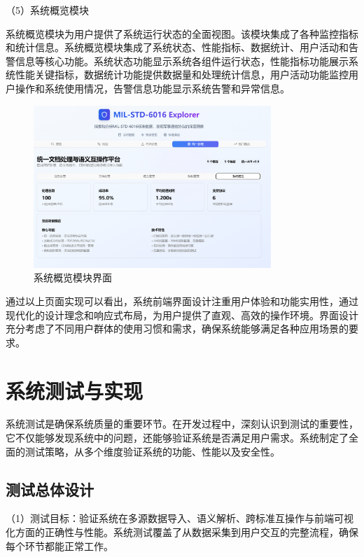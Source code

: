 （5）系统概览模块

系统概览模块为用户提供了系统运行状态的全面视图。该模块集成了各种监控指标和统计信息。系统概览模块集成了系统状态、性能指标、数据统计、用户活动和告警信息等核心功能。系统状态功能显示系统各组件运行状态，性能指标功能展示系统性能关键指标，数据统计功能提供数据量和处理统计信息，用户活动功能监控用户操作和系统使用情况，告警信息功能显示系统告警和异常信息。

\begin{figure}[H]
\centering
\includegraphics[width=0.8\textwidth]{chapters/fig-0/front_overview.png}
\caption{系统概览模块界面}
\label{fig:frontend-overview}
\end{figure}



通过以上页面实现可以看出，系统前端界面设计注重用户体验和功能实用性，通过现代化的设计理念和响应式布局，为用户提供了直观、高效的操作环境。界面设计充分考虑了不同用户群体的使用习惯和需求，确保系统能够满足各种应用场景的要求。

\section{系统测试与实现}

系统测试是确保系统质量的重要环节。在开发过程中，深刻认识到测试的重要性，它不仅能够发现系统中的问题，还能够验证系统是否满足用户需求。系统制定了全面的测试策略，从多个维度验证系统的功能、性能以及安全性。

\subsection{测试总体设计}

（1）测试目标：验证系统在多源数据导入、语义解析、跨标准互操作与前端可视化方面的正确性与性能。系统测试覆盖了从数据采集到用户交互的完整流程，确保每个环节都能正常工作。

